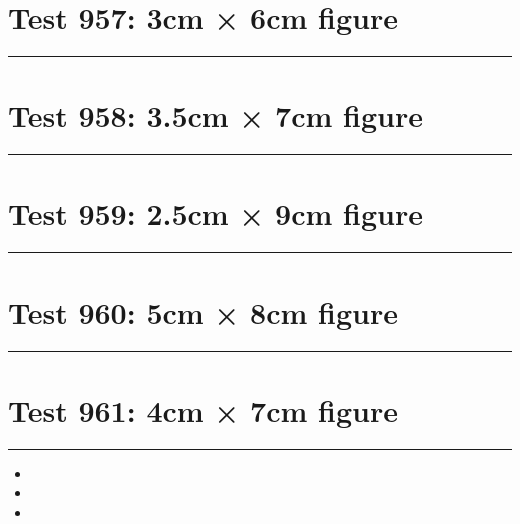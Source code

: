\documentclass[a4paper,11pt]{article}
\begin{document}
\section*{Test 957: 3cm × 6cm figure}
\begin{swarmwrap}%
  \begin{minipage}[t]{3cm}
    \centering
    \rule{\linewidth}{6cm}
  \end{minipage}%
\end{swarmwrap}%
\swarmwrapnext
\lipsum[110]
\lipsum[111]
\lipsum[112]
\lipsum[113]
\lipsum[114]
\section*{Test 958: 3.5cm × 7cm figure}
\begin{swarmwrap}%
  \begin{minipage}[t]{3cm}
    \centering
    \rule{\linewidth}{7cm}
  \end{minipage}%
\end{swarmwrap}%
\swarmwrapnext
\lipsum[66]
\lipsum[67]
\lipsum[68]
\lipsum[69]
\lipsum[70]
\lipsum[71]
\section*{Test 959: 2.5cm × 9cm figure}
\begin{swarmwrap}%
  \begin{minipage}[t]{2cm}
    \centering
    \rule{\linewidth}{9cm}
  \end{minipage}%
\end{swarmwrap}%
\swarmwrapnext
\lipsum[135]
\lipsum[136]
\lipsum[137]
\lipsum[138]
\lipsum[139]
\section*{Test 960: 5cm × 8cm figure}
\begin{swarmwrap}%
  \begin{minipage}[t]{5cm}
    \centering
    \rule{\linewidth}{8cm}
  \end{minipage}%
\end{swarmwrap}%
\swarmwrapnext
\lipsum[3]
\lipsum[4]
\lipsum[5]
\section*{Test 961: 4cm × 7cm figure}
\begin{swarmwrap}%
  \begin{minipage}[t]{4cm}
    \centering
    \rule{\linewidth}{7cm}
  \end{minipage}%
\end{swarmwrap}%
\swarmwrapnext
\lipsum[77]
\begin{itemize}
  \item \lipsum[78][1-3]
  \item \lipsum[79][1-3]
  \item \lipsum[80][1-3]
\end{itemize}
\end{document}
